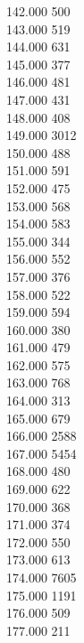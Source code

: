 { 142.000	500 \\
 143.000	519 \\
 144.000	631 \\
 145.000	377 \\
 146.000	481 \\
 147.000	431 \\
 148.000	408 \\
 149.000	3012 \\
 150.000	488 \\
 151.000	591 \\
 152.000	475 \\
 153.000	568 \\
 154.000	583 \\
 155.000	344 \\
 156.000	552 \\
 157.000	376 \\
 158.000	522 \\
 159.000	594 \\
 160.000	380 \\
 161.000	479 \\
 162.000	575 \\
 163.000	768 \\
 164.000	313 \\
 165.000	679 \\
 166.000	2588 \\
 167.000	5454 \\
 168.000	480 \\
 169.000	622 \\
 170.000	368 \\
 171.000	374 \\
 172.000	550 \\
 173.000	613 \\
 174.000	7605 \\
 175.000	1191 \\
 176.000	509 \\
 177.000	211 \\
}
